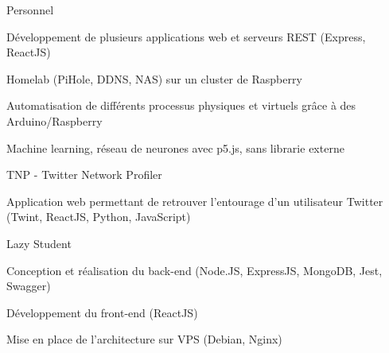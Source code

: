 
\begin{cventries}
  \cventry
    {} %
    {Personnel} %
    {} %
    {} %
    {
      \begin{cvitems} %
        \item {Développement de plusieurs applications web et serveurs REST (Express, ReactJS)}
        \item {Homelab (PiHole, DDNS, NAS) sur un cluster de Raspberry}
		\item {Automatisation de différents processus physiques et virtuels grâce à des Arduino/Raspberry}
        \item {Machine learning, réseau de neurones avec p5.js, sans librarie externe}
      \end{cvitems}
    }

  \cventry
    {} %
    {TNP - Twitter Network Profiler} %
    {} %
    {} %
    {
      \begin{cvitems} %
      	\item {Application web permettant de retrouver l'entourage d'un utilisateur Twitter (Twint, ReactJS, Python, JavaScript)}
      \end{cvitems}
    }

  \cventry
    {} %
    {Lazy Student} %
    {} %
    {} %
    {
      \begin{cvitems} %
      	\item {Conception et réalisation du back-end (Node.JS, ExpressJS, MongoDB, Jest, Swagger)}
		\item {Développement du front-end (ReactJS)}
		\item {Mise en place de l'architecture sur VPS (Debian, Nginx)}
      \end{cvitems}
    }
\end{cventries}